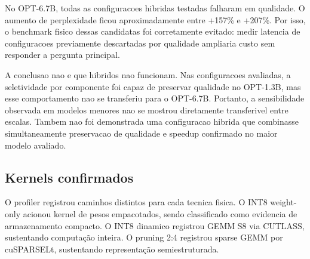 \documentclass[12pt, a4paper]{article}
\begin{document}
No OPT-6.7B, todas as configuracoes hibridas testadas falharam em qualidade.
O aumento de perplexidade ficou aproximadamente entre +157\% e +207\%. Por
isso, o benchmark fisico dessas candidatas foi corretamente evitado: medir
latencia de configuracoes previamente descartadas por qualidade ampliaria custo
sem responder a pergunta principal.

\begin{table}[H]
\centering
\caption{Hibridos avaliados em qualidade no OPT-6.7B}
\end{table}

A conclusao nao e que hibridos nao funcionam. Nas configuracoes avaliadas, a
seletividade por componente foi capaz de preservar qualidade no OPT-1.3B, mas
esse comportamento nao se transferiu para o OPT-6.7B. Portanto, a sensibilidade
observada em modelos menores nao se mostrou diretamente transferivel entre
escalas. Tambem nao foi demonstrada uma configuracao hibrida que combinasse
simultaneamente preservacao de qualidade e speedup confirmado no maior modelo
avaliado.

\subsection{Kernels confirmados}

O profiler registrou caminhos distintos para cada tecnica fisica. O INT8
weight-only acionou kernel de pesos empacotados, sendo classificado como
evidencia de armazenamento compacto. O INT8 dinamico registrou GEMM S8 via
CUTLASS, sustentando computa\c{c}\~ao inteira. O pruning 2:4 registrou sparse
GEMM por cuSPARSELt, sustentando representa\c{c}\~ao semiestruturada.
\end{document}
